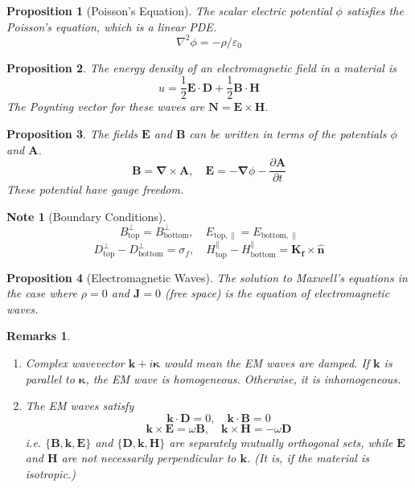 \documentclass[a4paper]{article}
\newtheorem{remarks}{Remarks}[section]
\newtheorem{Note}{Note}[section]
\theoremstyle{new}
\newtheorem{prop}{Proposition}[section]
\begin{document}
\begin{prop}[Poisson's Equation]
The scalar electric potential $\phi$ satisfies the Poisson's equation, which is a linear PDE.
$$\nabla^2\phi=-\rho/\varepsilon_0$$
\end{prop}
\begin{prop}
The energy density of an electromagnetic field in a material is
$$u=\frac{1}{2}\mathbf{E}\cdot\mathbf{D}+\frac{1}{2}\mathbf{B}\cdot\mathbf{H}$$
The Poynting vector for these waves are $\mathbf{N}=\mathbf{E}\times\mathbf{H}$.
\end{prop}
\begin{prop}
The fields $\mathbf{E}$ and $\mathbf{B}$ can be written in terms of the potentials $\phi$ and $\mathbf{A}$. 
$$\mathbf{B}=\boldsymbol{\nabla}\times\mathbf{A},\quad\mathbf{E}=-\boldsymbol{\nabla}\phi-\frac{\partial\mathbf{A}}{\partial t}$$
These potential have gauge freedom.
\end{prop}
\begin{Note}[Boundary Conditions]
$$B_{\text{top}}^{\perp}=B_{\text{bottom}}^{\perp},\quad E_{\text{top},\parallel}=E_{\text{bottom},\parallel}$$
$$D_{\text{top}}^{\perp}-D_{\text{bottom}}^{\perp}=\sigma_f,\quad H_{\text{top}}^{\parallel}-H_{\text{bottom}}^{\parallel}=\mathbf{K_f}\times\mathbf{\hat{n}}$$
\end{Note}
\begin{prop}[Electromagnetic Waves]
The solution to Maxwell's equations in the case where $\rho=0$ and $\mathbf{J}=0$ (free space) is the equation of electromagnetic waves.
\end{prop}
\begin{remarks}\leavevmode
\begin{enumerate}
    \item Complex wavevector $\mathbf{k}+i\boldsymbol{\kappa}$ would mean the EM waves are damped. If $\mathbf{k}$ is parallel to $\boldsymbol{\kappa}$, the EM wave is homogeneous. Otherwise, it is inhomogeneous.
    \item The EM waves satisfy
    $$\mathbf{k}\cdot\mathbf{D}=0,\quad\mathbf{k}\cdot\mathbf{B}=0$$
    $$\mathbf{k}\times\mathbf{E}=\omega\mathbf{B},\quad\mathbf{k}\times\mathbf{H}=-\omega\mathbf{D}$$
    i.e. $\{\mathbf{B},\mathbf{k},\mathbf{E}\}$ and $\{\mathbf{D},\mathbf{k},\mathbf{H}\}$ are separately mutually orthogonal sets, while $\mathbf{E}$ and $\mathbf{H}$ are not necessarily perpendicular to $\mathbf{k}$. (It is, if the material is isotropic.)
\end{enumerate}
\end{remarks}
\end{document}

